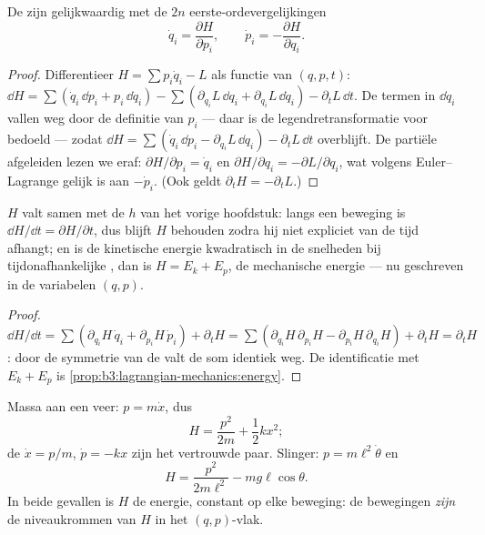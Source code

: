 \begin{theorem}\label{thm:b3:hamiltonian-mechanics:canonical}
De  zijn gelijkwaardig met de $2n$
eerste-ordevergelijkingen
\[
\dot q_i = \frac{\partial H}{\partial p_i} , \qquad
\dot p_i = -\frac{\partial H}{\partial q_i} .
\]
\end{theorem}

\begin{proof}
Differentieer $H = \sum p_i\dot q_i - L$ als functie van $(q, p, t)$:
$\dd H = \sum(\dot q_i\,\dd p_i + p_i\,\dd\dot q_i) - \sum(
\partial_{q_i}L\,\dd q_i + \partial_{\dot q_i}L\,\dd\dot q_i) -
\partial_tL\,\dd t$. De termen in $\dd\dot q_i$ vallen weg door de
definitie van $p_i$ --- daar is de legendretransformatie voor bedoeld ---
zodat $\dd H = \sum(\dot q_i\,\dd p_i - \partial_{q_i}L\,\dd q_i) -
\partial_tL\,\dd t$ overblijft. De partiële afgeleiden lezen we eraf:
$\partial H/\partial p_i = \dot q_i$ en $\partial H/\partial q_i =
-\partial L/\partial q_i$, wat volgens Euler--Lagrange gelijk is aan
$-\dot p_i$. (Ook geldt $\partial_tH = -\partial_tL$.)
\end{proof}

\begin{proposition}[Wat $H$ is]\label{prop:b3:hamiltonian-mechanics:energy}
$H$ valt samen met de  $h$ van het vorige hoofdstuk: langs
een beweging is $\dd H/\dd t = \partial H/\partial t$, dus blijft $H$
behouden zodra hij niet expliciet van de tijd afhangt; en is de
kinetische energie kwadratisch in de snelheden bij tijdonafhankelijke
, dan is $H = E_k + E_p$, de mechanische energie --- nu
geschreven in de variabelen $(q, p)$.
\end{proposition}

\begin{proof}
$\dd H/\dd t = \sum(\partial_{q_i}H\,\dot q_i + \partial_{p_i}H\,\dot
p_i) + \partial_tH = \sum(\partial_{q_i}H\,\partial_{p_i}H -
\partial_{p_i}H\,\partial_{q_i}H) + \partial_tH = \partial_tH$: door de
symmetrie van de  valt de som identiek weg. De
identificatie met $E_k + E_p$ is
\cref{prop:b3:lagrangian-mechanics:energy}.
\end{proof}

\begin{example}\label{ex:b3:hamiltonian-mechanics:examples}
Massa aan een veer: $p = m\dot x$, dus
\[
H = \frac{p^2}{2m} + \frac12 kx^2 ;
\]
de  $\dot x = p/m$, $\dot p = -kx$ zijn het
vertrouwde paar. Slinger: $p = m\ell^2\dot\theta$ en
\[
H = \frac{p^2}{2m\ell^2} - mg\ell\cos\theta .
\]
In beide gevallen is $H$ de energie, constant op elke beweging: de
bewegingen \emph{zijn} de niveaukrommen van $H$ in het $(q,p)$-vlak.
\end{example}

